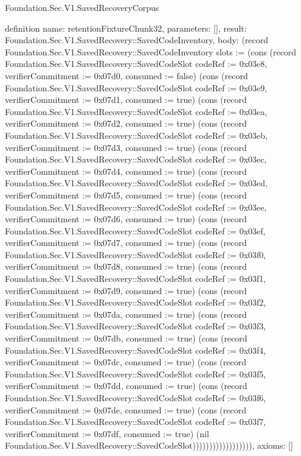 \begin{lexlean}{Foundation.Sec.V1.SavedRecoveryCorpus}
\begin{semanticmodule}
definition{
  name: retentionFixtureChunk32,
  parameters: [],
  result: Foundation.Sec.V1.SavedRecovery::SavedCodeInventory,
  body: (record Foundation.Sec.V1.SavedRecovery::SavedCodeInventory {slots := (cons (record Foundation.Sec.V1.SavedRecovery::SavedCodeSlot {codeRef := 0x03e8, verifierCommitment := 0x07d0, consumed := false}) (cons (record Foundation.Sec.V1.SavedRecovery::SavedCodeSlot {codeRef := 0x03e9, verifierCommitment := 0x07d1, consumed := true}) (cons (record Foundation.Sec.V1.SavedRecovery::SavedCodeSlot {codeRef := 0x03ea, verifierCommitment := 0x07d2, consumed := true}) (cons (record Foundation.Sec.V1.SavedRecovery::SavedCodeSlot {codeRef := 0x03eb, verifierCommitment := 0x07d3, consumed := true}) (cons (record Foundation.Sec.V1.SavedRecovery::SavedCodeSlot {codeRef := 0x03ec, verifierCommitment := 0x07d4, consumed := true}) (cons (record Foundation.Sec.V1.SavedRecovery::SavedCodeSlot {codeRef := 0x03ed, verifierCommitment := 0x07d5, consumed := true}) (cons (record Foundation.Sec.V1.SavedRecovery::SavedCodeSlot {codeRef := 0x03ee, verifierCommitment := 0x07d6, consumed := true}) (cons (record Foundation.Sec.V1.SavedRecovery::SavedCodeSlot {codeRef := 0x03ef, verifierCommitment := 0x07d7, consumed := true}) (cons (record Foundation.Sec.V1.SavedRecovery::SavedCodeSlot {codeRef := 0x03f0, verifierCommitment := 0x07d8, consumed := true}) (cons (record Foundation.Sec.V1.SavedRecovery::SavedCodeSlot {codeRef := 0x03f1, verifierCommitment := 0x07d9, consumed := true}) (cons (record Foundation.Sec.V1.SavedRecovery::SavedCodeSlot {codeRef := 0x03f2, verifierCommitment := 0x07da, consumed := true}) (cons (record Foundation.Sec.V1.SavedRecovery::SavedCodeSlot {codeRef := 0x03f3, verifierCommitment := 0x07db, consumed := true}) (cons (record Foundation.Sec.V1.SavedRecovery::SavedCodeSlot {codeRef := 0x03f4, verifierCommitment := 0x07dc, consumed := true}) (cons (record Foundation.Sec.V1.SavedRecovery::SavedCodeSlot {codeRef := 0x03f5, verifierCommitment := 0x07dd, consumed := true}) (cons (record Foundation.Sec.V1.SavedRecovery::SavedCodeSlot {codeRef := 0x03f6, verifierCommitment := 0x07de, consumed := true}) (cons (record Foundation.Sec.V1.SavedRecovery::SavedCodeSlot {codeRef := 0x03f7, verifierCommitment := 0x07df, consumed := true}) (nil Foundation.Sec.V1.SavedRecovery::SavedCodeSlot)))))))))))))))))}),
  axioms: []
}


\end{semanticmodule}
\end{lexlean}
